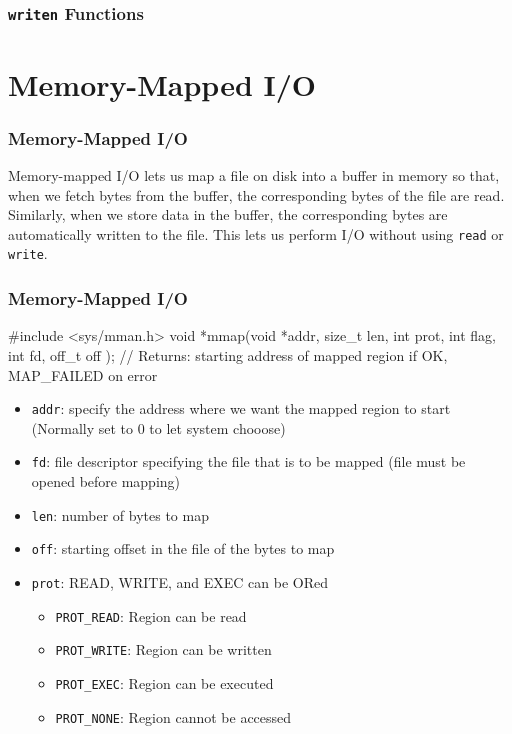 \documentclass[newPxFont,sthlmFooter,nooffset]{beamer}
\begin{document}
\begin{frame}[t]
  \frametitle{\texttt{writen} Functions}
      

\end{frame}


\section{Memory-Mapped I/O}
\begin{frame}[t, fragile]
  \frametitle{Memory-Mapped I/O}
Memory-mapped I/O lets us map a file on disk into a buffer in memory so that, when we fetch bytes from the buffer, the corresponding bytes of the file are read.  
\bigskip
Similarly, when we store data in the buffer, the corresponding bytes are automatically written to the file. This lets us perform I/O without using \texttt{read} or \texttt{write}.


\end{frame}

\begin{frame}[t, fragile]
  \frametitle{Memory-Mapped I/O}

\begin{codedef}
#include <sys/mman.h>
void *mmap(void *addr, size_t len, int prot, int flag, int fd, off_t off );
// Returns: starting address of mapped region if OK, MAP_FAILED on error  
\end{codedef}
{\footnotesize
\begin{itemize}
\item \texttt{addr}: specify the address where we want the mapped region to start (Normally set to 0 to let system chooose)
\item \texttt{fd}: file descriptor specifying the file that is to be mapped (file must be opened before mapping)
\item \texttt{len}: number of bytes to map
\item \texttt{off}: starting offset in the file of the bytes to map
\item \texttt{prot}: READ, WRITE, and EXEC can be ORed
  \begin{itemize}
  \item \texttt{PROT\_READ}: Region can be read
  \item \texttt{PROT\_WRITE}: Region can be written
  \item \texttt{PROT\_EXEC}: Region can be executed
  \item \texttt{PROT\_NONE}: Region cannot be accessed
  \end{itemize}

\end{itemize}
}
\end{frame}
\end{document}
